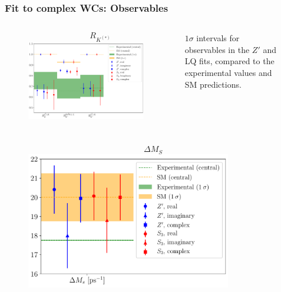 \documentclass[mathserif, 10pt, dvipsnames]{beamer}
\begin{document}
\begin{frame}\frametitle{Fit to complex WCs: Observables}
    \begin{figure}
        \begin{columns}
            \begin{column}{0.48\textwidth}
                \centering
$$R_{K^{(*)}}$$
                \includegraphics[width = 0.8\textwidth]{figures/errorplot_RKmodels.pdf}
            \end{column}
            \begin{column}{0.48\textwidth}
$1\sigma$ intervals for observables in the
    {\color{blue}$Z'$} and {\color{red} LQ} fits, compared
to the {\color{green} experimental values} and
    {\color{orange} SM predictions}.
            \end{column}
        \end{columns}
    \end{figure}
\vspace{-0.2cm}
    \begin{figure}
        \begin{columns}
            \begin{column}{0.48\textwidth}
                \centering
$$\Delta M_S$$
                \includegraphics[width = 0.8\textwidth]{figures/errorplot_DMsmodels.pdf}

\end{column}
\end{columns}
\end{figure}
\end{frame}
\end{document}
